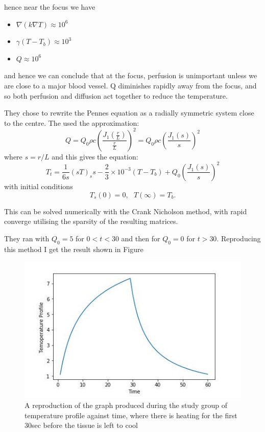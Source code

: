 \documentclass[11pt]{article} %
\begin{document}
 	hence near the focus we have 
 	\begin{itemize}
 		\item $\nabla (k\nabla T) \approx 10^6$
 		\item $ \gamma (T-T_b) \approx 10^3$
 		\item $ Q \approx 10^6$
 	\end{itemize}
 and hence we can conclude that at the focus, perfusion is unimportant unless we are close to a major blood vessel.  Q diminishes rapidly away from the focus, and so both perfusion and diffusion act together to reduce the temperature. 
 
 They chose to rewrite the Pennes equation as a radially symmetric system close to the centre. The used the approximation: 
 \begin{equation}
 Q=Q_0 \rho c \left(\frac{J_1\left(\frac{r}{L}\right)}{\frac{r}{L}}\right)^2= Q_0\rho c \left(\frac{J_1(s)}{s}\right)^2
 \end{equation}
 where $s=r/L$ and this gives the equation:
 \begin{equation}
 T_t=\frac{1}{6s}(sT)_ss-\frac{2}{3}\times 10^{-3}(T-T_b)+Q_0 \left(\frac{J_1(s)}{s}\right)^2
 \end{equation}
 with initial conditions $$ T_s(0)=0 , \ \ \ T(\infty)=T_b .$$
 
 This can be solved numerically with the Crank Nicholson method, with rapid converge utilising the sparsity of the resulting matrices. 
 
 They ran with $Q_0=5$ for $0<t<30$ and then for $Q_0=0$ for $t>30$. Reproducing this method I get the result shown in Figure 
 
 \begin{figure}
 	\centering
 	\includegraphics[width=0.7\linewidth]{Report_images/studygroupcode}
 	\caption{A reproduction of the graph produced during the study group of temperature profile against time, where there is heating for the first 30sec before the tissue is left to cool}
 	\label{fig:studygroupcode}
 \end{figure}
 
\end{document}
